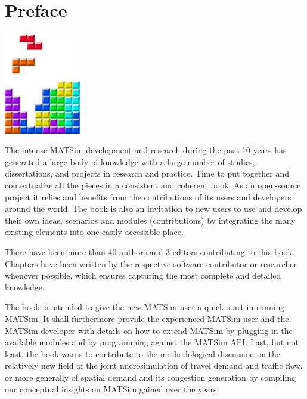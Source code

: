 \chapter*{Preface}

\begin{center} \includegraphics[width=0.25\textwidth, angle=0]{figures/MATSimBook.png} \end{center}


The intense MATSim development and research during the past 10 years has generated a large body of knowledge with a large number of studies, dissertations, and projects in research and practice. Time to put together and contextualize all the pieces in a consistent and coherent book. As an open-source project it relies and benefits from the contributions of its users and developers around the world. The book is also an invitation to new users to use and develop their own ideas, scenarios and modules (contributions) by integrating the many existing elements into one easily accessible place.

There have been more than 40 authors and 3 editors contributing to this book. Chapters have been written by the respective software contributor or researcher whenever possible, which ensures capturing the most complete and detailed knowledge. 

The book is intended to give the new MATSim user a quick start in running MATSim. It shall furthermore provide the experienced MATSim user and the MATSim developer with details on how to extend MATSim by plugging in the available modules and by programming against the MATSim API. Last, but not least, the book wants to contribute to the methodological discussion on the relatively new field of the joint microsimulation of travel demand and traffic flow, or more generally of spatial demand and its congestion generation by compiling our conceptual insights on MATSim gained over the years.

